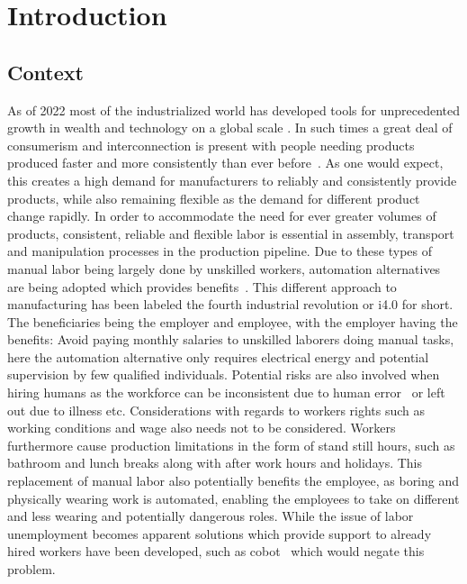 \chapter{Introduction}\label{ch:intro}

\section{Context}\label{sec:intro-context}

As of 2022 most of the industrialized world has developed tools for unprecedented growth in wealth and technology on a global scale \cite[Chapter 4]{technology-and-inequalities}. In such times a great deal of consumerism and interconnection is present with people needing products produced faster and more consistently than ever before~\cite[Chapter 4]{technology-and-inequalities}. 
As one would expect, this creates a high demand for manufacturers to reliably and consistently provide products, while also remaining flexible as the demand for different product change rapidly. 
In order to accommodate the need for ever greater volumes of products, consistent, reliable and flexible labor is essential in assembly, transport and manipulation processes in the production pipeline. Due to these types of manual labor being largely done by unskilled workers, automation alternatives are being adopted which provides benefits~\cite[Chapter 4]{technology-and-inequalities}. This different approach to manufacturing has been labeled the fourth industrial revolution or i4.0 for short.
The beneficiaries being the employer and employee, with the employer having the benefits: Avoid paying monthly salaries to unskilled laborers doing manual tasks, here the automation alternative only requires electrical energy and potential supervision by few qualified individuals. Potential risks are also involved when hiring humans as the workforce can be inconsistent due to human error~\cite{analysis-and-control-of-human-error} or left out due to illness etc. Considerations with regards to workers rights such as working conditions and wage also needs not to be considered. Workers furthermore cause production limitations in the form of stand still hours, such as bathroom and lunch breaks along with after work hours and holidays.
This replacement of manual labor also potentially benefits the employee, as boring and physically wearing work is automated, enabling the employees to take on different and less wearing and potentially dangerous roles. While the issue of labor unemployment becomes apparent solutions which provide support to already hired workers have been developed, such as \gls{cobot}~\cite{cobots-and-the-benefits-of-their-implementation-in-intelligent-manufacturing} which would negate this problem. \medskip

